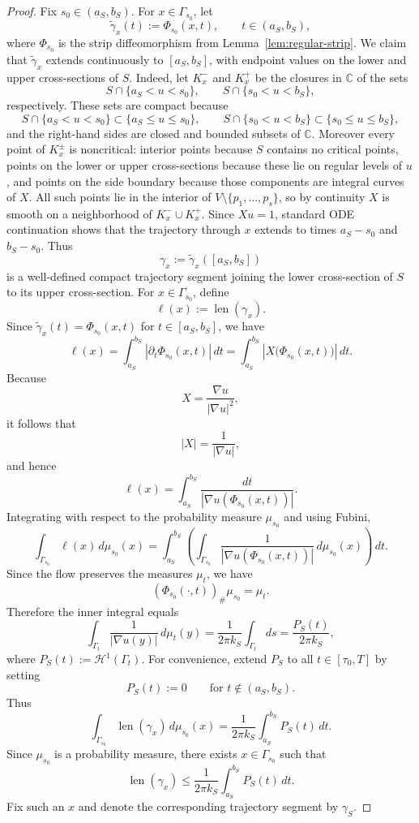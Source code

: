 \documentclass[12pt]{amsart}
\theoremstyle{definition}
\theoremstyle{remark}
\begin{document}
\begin{proof}
\indent Fix $s_0\in(a_S,b_S)$. For $x\in\Gamma_{s_0}$, let
\[
\widetilde\gamma_x(t):=\Phi_{s_0}(x,t),\qquad t\in(a_S,b_S),
\]
where $\Phi_{s_0}$ is the strip diffeomorphism from Lemma~\ref{lem:regular-strip}. We claim that $\widetilde\gamma_x$ extends continuously to
$[a_S,b_S]$, with endpoint values on the lower and upper cross-sections of $S$. Indeed, let $K_x^-$ and $K_x^+$
be the closures in $\mathbb{C}$ of the sets
\[
 S\cap\{a_S<u<s_0\}, \qquad S\cap\{s_0<u<b_S\},
\]
respectively. These sets are compact because
\[
S\cap\{a_S<u<s_0\}\subset\{a_S\le u\le s_0\},\qquad S\cap\{s_0<u<b_S\}\subset\{s_0\le u\le b_S\},
\]
and the right-hand sides are closed and bounded subsets of $\mathbb{C}$. Moreover every point of $K_x^{\pm}$ is
noncritical: interior points because $S$ contains no critical points, points on the lower or upper
cross-sections because these lie on regular levels of $u$, and points on the side boundary because
those components are integral curves of $X$. All such points lie in the interior of $V\setminus\{p_1,\dots,p_s\}$,
so by continuity $X$ is smooth on a neighborhood of $K_x^-\cup K_x^+$. Since $Xu=1$, standard ODE
continuation shows that the trajectory through $x$ extends to times $a_S-s_0$ and $b_S-s_0$. Thus
\[
\gamma_x:=\widetilde\gamma_x([a_S,b_S])
\]
is a well-defined compact trajectory segment joining the lower cross-section of $S$ to its upper
cross-section. For $x\in\Gamma_{s_0}$, define
\[
\ell(x):=\operatorname{len}(\gamma_x).
\]
Since $\widetilde\gamma_x(t)=\Phi_{s_0}(x,t)$ for $t\in[a_S,b_S]$, we have
\[
\ell(x)
=
\int_{a_S}^{b_S}\left|\partial_t\Phi_{s_0}(x,t)\right|\,dt
=
\int_{a_S}^{b_S}\left|X\bigl(\Phi_{s_0}(x,t)\bigr)\right|\,dt.
\]
Because
\[
X=\frac{\nabla u}{|\nabla u|^2},
\]
it follows that
\[
|X|=\frac{1}{|\nabla u|},
\]
and hence
\[
\ell(x)
=
\int_{a_S}^{b_S}\frac{dt}{|\nabla u(\Phi_{s_0}(x,t))|}.
\]
Integrating with respect to the probability measure $\mu_{s_0}$ and using Fubini,
\[
\int_{\Gamma_{s_0}}\ell(x)\,d\mu_{s_0}(x)
=
\int_{a_S}^{b_S}
\left(
\int_{\Gamma_{s_0}}
\frac{1}{|\nabla u(\Phi_{s_0}(x,t))|}
\,d\mu_{s_0}(x)
\right)\,dt.
\]
Since the flow preserves the measures $\mu_t$, we have
\[
(\Phi_{s_0}(\cdot,t))_{\#}\mu_{s_0}=\mu_t.
\]
Therefore the inner integral equals
\[
\int_{\Gamma_t}\frac{1}{|\nabla u(y)|}\,d\mu_t(y)
=
\frac{1}{2\pi k_S}\int_{\Gamma_t} ds
=
\frac{P_S(t)}{2\pi k_S},
\]
where $P_S(t):=\mathcal H^1(\Gamma_t)$. For convenience, extend $P_S$ to all $t\in[\tau_0,T]$ by setting
\[
P_S(t):=0 \qquad\text{for } t\notin (a_S,b_S).
\]
Thus
\[
\int_{\Gamma_{s_0}} \operatorname{len}(\gamma_x)\,d\mu_{s_0}(x)
=
\frac{1}{2\pi k_S}\int_{a_S}^{b_S} P_S(t)\,dt.
\]
Since $\mu_{s_0}$ is a probability measure, there exists $x\in \Gamma_{s_0}$ such that
\[
\operatorname{len}(\gamma_x)\le \frac{1}{2\pi k_S}\int_{a_S}^{b_S} P_S(t)\,dt.
\]
Fix such an $x$ and denote the corresponding trajectory segment by $\gamma_S$.


\end{proof}
\end{document}
